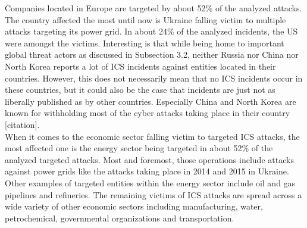 \documentclass[runningheads]{llncs}
\begin{document}
Companies located in Europe are targeted by about 52\% of the analyzed attacks. The country affected the most until now is Ukraine falling victim to multiple attacks targeting its power grid.
In about 24\% of the analyzed incidents, the US were amongst the victims.
Interesting is that while being home to important global threat actors as discussed in Subsection 3.2, neither Russia nor China nor North Korea reports a lot of ICS incidents against entities located in their countries.
However, this does not necessarily mean that no ICS incidents occur in these countries, but it could also be the case that incidents are just not as liberally published as by other countries.
Especially China and North Korea are known for withholding most of the cyber attacks taking place in their country [citation].\\
When it comes to the economic sector falling victim to targeted ICS attacks, the most affected one is the energy sector being targeted in about 52\% of the analyzed targeted attacks.
Most and foremost, those operations include attacks against power grids like the attacks taking place in 2014 and 2015 in Ukraine.
Other examples of targeted entities within the energy sector include oil and gas pipelines and refineries.
The remaining victims of ICS attacks are spread across a wide variety of other economic sectors including manufacturing, water, petrochemical, governmental organizations and transportation.
\end{document}
